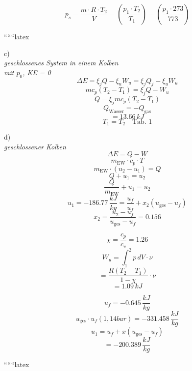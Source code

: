 \[
p_s = \frac{m \cdot R \cdot T_2}{V} = \left( \frac{p_1 \cdot T_2}{T_1} \right) = \left( \frac{p_1 \cdot 273}{773} \right)
\]

``````latex


c) \\
\textit{geschlossenes System in einem Kolben} \\
\textit{mit $p_0$, KE = 0} \\
\[
\Delta E = \xi_j Q - \xi_u W_u = \xi_j Q_j - \xi_u W_u
\]
\[
m c_p (T_2 - T_1) = \xi_j Q - W_u
\]
\[
Q = \xi_j m c_p (T_2 - T_1)
\]
\[
Q_{\text{Wasser}} = -Q_{\text{gas}}
\]
\[
= 13.66 \, kJ
\]
\[
T_1 = T_2 \quad \text{Tab. 1}
\]

d) \\
\textit{geschlossener Kolben} \\
\[
\Delta E = Q - W
\]
\[
m_{\text{EW}} \cdot c_p \cdot T
\]
\[
m_{\text{EW}} \cdot (u_2 - u_1) = Q
\]
\[
Q + u_1 = u_2
\]
\[
\frac{Q}{m_{\text{EW}}} + u_1 = u_2
\]
\[
u_1 = -186.77 \, \frac{kJ}{kg} = \frac{u_f}{u_f} + x_2 (u_{\text{ges}} - u_f)
\]
\[
x_2 = \frac{u_2 - u_f}{u_{\text{ges}} - u_f} = 0.156
\]

\[
\chi = \frac{c_p}{c_v} = 1.26
\]
\[
W_u = \int_1^2 p \, dV \cdot \nu
\]
\[
= \frac{R (T_2 - T_1)}{1 - \chi} \cdot \nu
\]
\[
= 1.09 \, kJ
\]

\[
u_f = -0.645 \, \frac{kJ}{kg}
\]
\[
u_{\text{ges}} \cdot u_f (1,14 bar) = -331.458 \, \frac{kJ}{kg}
\]
\[
u_1 = u_f + x (u_{\text{ges}} - u_f)
\]
\[
= -200.389 \, \frac{kJ}{kg}
\]

``````latex


